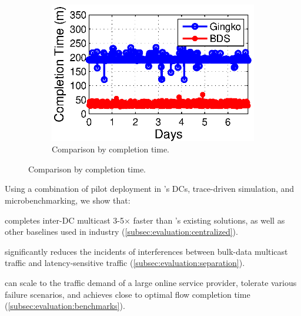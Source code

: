 \begin{figure}[t]
\begin{subfigure}[b]{0.3\textwidth}
                \label{fig:BDSvsAnon:FCT}
        \end{subfigure}
        \begin{subfigure}[b]{0.3\textwidth}
                \centering
                \includegraphics[width=\textwidth]{images/BDSvsAnon_time_v2.eps}
                \caption{Comparison by completion time.}
                \label{fig:BDSvsAnon:time}
        \end{subfigure}
        \label{fig:BDSvsAnon}
\vspace{-0.4cm}
\end{figure}

Using a combination of pilot deployment in \company's DCs, 
trace-driven simulation, and microbenchmarking, we show that:
\begin{packedenumerate}
\item \name completes inter-DC multicast 3-5$\times$ faster than 
\company's existing solutions, as well as other baselines used in 
industry (\Section\ref{subsec:evaluation:centralized}).
\item \name significantly reduces the incidents of interferences 
between bulk-data multicast traffic and latency-sensitive traffic 
(\Section\ref{subsec:evaluation:separation}).
\item \name can scale to the traffic demand of a large online 
service provider, tolerate various failure scenarios, and achieves 
close to optimal flow completion time
(\Section\ref{subsec:evaluation:benchmarks}).
\end{packedenumerate}


